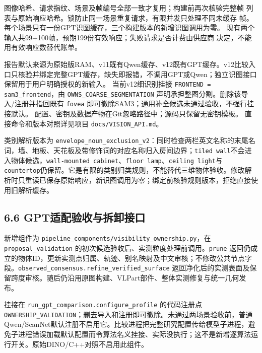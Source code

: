 \documentclass[UTF8,fontset=fandol]{ctexart}
\begin{document}
图像哈希、请求指纹、场景及帧编号全部一致才复用；构建前再次核验完整帧
列表与原始响应哈希。锁防止同一场景重复请求，有限并发只处理不同未缓存
帧。每个场景只有一份GPT识图缓存，三个构建版本的新增识图调用为零。
现有两个输入共99+100帧，预期199份有效响应；失败请求是否计费由供应商
决定，不能用有效响应数替代账单。



报告默认来源为原始版RAM、v11既有Qwen缓存、v12既有GPT缓存。v12比较入口只核验并绑定完整GPT缓存，缺失即报错，不调用GPT或Qwen；独立识图接口保留用于用户明确授权的新输入。
当前v12细识别挂接 \texttt{FRONTEND = sam3\_\allowbreak{}frontend}，由 \texttt{OWNS\_\allowbreak{}COARSE\_\allowbreak{}SEGMENTATION} 声明承担整图分割。删除该导入/注册并指回既有 \texttt{fovea} 即可撤除SAM3；通用补全候选未通过验收，不强行挂接默认。
配置、密钥及数据产物在Git忽略路径中；源码只保留无密钥模板。
直接命令和版本对照详见项目 \texttt{docs/\allowbreak{}VISION\_\allowbreak{}API.\allowbreak{}md}。



类别解析版本为 \texttt{envelope\_\allowbreak{}noun\_\allowbreak{}exclusion\_\allowbreak{}v2}：同时检查两栏英文名称的末尾名词，墙、地板、天花板及带修饰词的对应名称归入房间边界；\texttt{tiled wall}不会进入物体候选，\texttt{wall-mounted cabinet}、\texttt{floor lamp}、\texttt{ceiling light}与\texttt{countertop}仍保留。它是有限的类别归类规则，不能替代三维物体验收。修改解析时只重读已保存原始响应，新识图调用为零；绑定前核验规则版本，拒绝直接使用旧解析缓存。



\subsection*{6.6 GPT适配验收与拆卸接口}

新增组件为 \texttt{pipeline\_\allowbreak{}components/\allowbreak{}visibility\_\allowbreak{}ownership.\allowbreak{}py}，在 \texttt{proposal\_\allowbreak{}validation} 的初次候选验收后、实测粒度处理前调用。\texttt{prune} 返回仍成立的物体ID，更新实测点归属、轨迹、别名映射及中文审核；不修改公共节点字段。\texttt{observed\_\allowbreak{}consensus.\allowbreak{}refine\_\allowbreak{}verified\_\allowbreak{}surface} 返回净化后的实测表面及保留跨度审核。随后仍沿用原图构建、VLPart部件、整体实测修复与统一几何发布。



挂接在 \texttt{run\_\allowbreak{}gpt\_\allowbreak{}comparison.\allowbreak{}configure\_\allowbreak{}profile} 的代码注册点 \texttt{OWNERSHIP\_\allowbreak{}VALIDATION}；删去导入和注册即可撤除。未通过两场景验收前，普通Qwen/ScanNet默认注册不启用它。比较进程把完整研究配置传给模型子进程，避免子进程错误加载默认配置而令算法名义挂接、实际没执行；这不是新增逐算法运行开关。原始DINO/C++对照不启用此组件。
\end{document}
